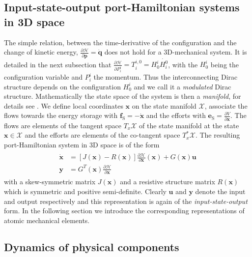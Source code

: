 \documentclass[a4paper,twoside, openright,12pt]{report}
\newcommand{\f}[1]{\boldsymbol{#1}}
\newcommand{\g}[1]{\text{#1}}
\begin{document}
{\subsection{Input-state-output port-Hamiltonian systems in 3D space}
The simple relation, between the time-derivative of the configuration and the change of kinetic energy, $\frac{\partial \mathcal{H}}{\partial \f{p}}=\dot{\f{q}}$ does not hold for a 3D-mechanical system. It is detailed in the next subsection that $\frac{\partial \mathcal{H}}{\partial P_i^i} = T_i^{i,0} = H_0^i \dot{H_i^0}$, with the $H_0^i$ being the configuration variable and $P_i^i$ the momentum. Thus the interconnecting Dirac structure depends on the configuration $H_0^i$ and we call it a \emph{modulated} Dirac structure. Mathematically the state space of the system is then a \emph{manifold}, for details see \cite{Schaft_14}. We define local coordinates $\f{x}$ on the state manifold $\mathcal{X}$, associate the flows towards the energy storage with $\f{f}_\g{S} = -\dot{\f{x}}$ and the efforts with $\f{e}_\g{S} = \frac{\partial V}{\partial \f{x}}$. The flows are elements of the tangent space $T_x\mathcal{X}$ of the state manifold at the state $\f{x} \in \mathcal{X}$ and the efforts are elements of the co-tangent space $T_x^*\mathcal{X}$. The resulting port-Hamiltonian system in 3D space is of the form
\begin{eqnarray}
\begin{aligned}
\dot{\f{x}} &= [J(\f{x})-R(\f{x})]\frac{\partial \mathcal{H}}{\partial \f{x}}(\f{x}) + G(\f{x}) \f{u} \\
\f{y} &= G^T(\f{x})\frac{\partial \mathcal{H}}{\partial \f{x}}
\end{aligned}
\end{eqnarray}
with a skew-symmetric matrix $J(\f{x})$ and a resistive structure matrix $R(\f{x})$ which is symmetric and positive semi-definite. Clearly $\f{u}$ and $\f{y}$ denote the input and output respectively and this representation is again of the \emph{input-state-output} form. In the following section we introduce the corresponding representations of atomic mechanical elements.




\subsection{Dynamics of physical components}\label{SS:DynamicsPhysicalComponents}
}
\end{document}
